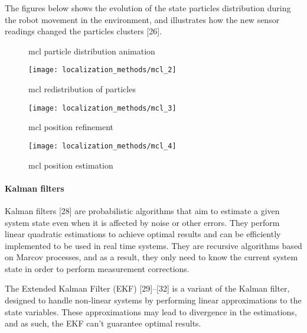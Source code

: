 The figures below shows the evolution of the state particles distribution during the robot movement in the environment, and illustrates how the new sensor readings changed the particles clusters [26].

\begin{figure}
	\centering
	\begin{minipage}[h]{.49\textwidth}
		\centering
		\caption{\gls{mcl} particle distribution animation}
		\label{fig:localization-methods_mcl1}
	\end{minipage}\hfill
	\begin{minipage}[h]{.49\textwidth}
		\centering
		\texttt{[image: localization\_methods/mcl\_2]}
		\caption{\gls{mcl} redistribution of particles}
		\label{fig:localization-methods_mcl2}
	\end{minipage}
\end{figure}

\begin{figure}
	\centering
	\begin{minipage}[h]{.49\textwidth}
		\centering
		\texttt{[image: localization\_methods/mcl\_3]}
		\caption{\gls{mcl} position refinement}
		\label{fig:localization-methods_mcl3}
	\end{minipage}\hfill
	\begin{minipage}[h]{.49\textwidth}
		\centering
		\texttt{[image: localization\_methods/mcl\_4]}
		\caption{\gls{mcl} position estimation}
		\label{fig:localization-methods_mcl4}
	\end{minipage}
\end{figure}


\paragraph{Kalman filters}

Kalman filters [28] are probabilistic algorithms that aim to estimate a given system state even when it is affected by noise or other errors. They perform linear quadratic estimations to achieve optimal results and can be efficiently implemented to be used in real time systems. They are recursive algorithms based on Marcov processes, and as a result, they only need to know the current system state in order to perform measurement corrections.

The Extended Kalman Filter (EKF) [29]--[32] is a variant of the Kalman filter, designed to handle non-linear systems by performing linear approximations to the state variables. These approximations may lead to divergence in the estimations, and as such, the EKF can't guarantee optimal results.

